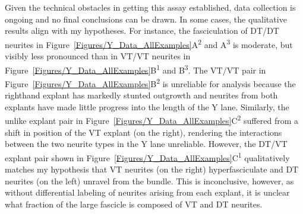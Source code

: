 Given the technical obstacles in getting this assay established, data collection is ongoing and no final conclusions can be drawn.
In some cases, the qualitative results align with my hypotheses.
For instance, the fasciculation of DT/DT neurites in Figure~\ref{Figures/Y_Data_AllExamples}A\textsuperscript{2} and A\textsuperscript{3} is moderate, but visibly less pronounced than in VT/VT neurites in Figure~\ref{Figures/Y_Data_AllExamples}B\textsuperscript{1} and B\textsuperscript{3}.
The VT/VT pair in Figure~\ref{Figures/Y_Data_AllExamples}B\textsuperscript{2} is unreliable for analysis because the righthand explant has markedly stunted outgrowth and neurites from both explants have made little progress into the length of the Y lane.
Similarly, the unlike explant pair in Figure~\ref{Figures/Y_Data_AllExamples}C\textsuperscript{2} suffered from a shift in position of the VT explant (on the right), rendering the interactions between the two neurite types in the Y lane unreliable.
However, the DT/VT explant pair shown in Figure~\ref{Figures/Y_Data_AllExamples}C\textsuperscript{1} qualitatively matches my hypothesis that VT neurites (on the right) hyperfasciculate and DT neurites (on the left) unravel from the bundle.
This is inconclusive, however, as without differential labeling of neurites arising from each explant, it is unclear what fraction of the large fascicle is composed of VT and DT neurites.

